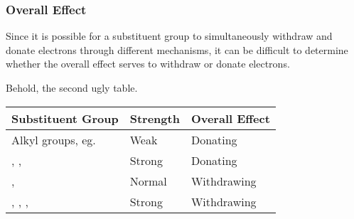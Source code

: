 


	\pagebreak
	\subsubsection{Overall Effect}

		Since it is possible for a substituent group to simultaneously withdraw and donate electrons through different mechanisms,
		it can be difficult to determine whether the overall effect serves to withdraw or donate electrons.

		Behold, the second ugly table.

		\begin{center}\begin{table}[ht]\renewcommand{\arraystretch}{1.4}
		\begin{tabu} to \textwidth {| X[c,m] | X[c,m] | X[c,m] |}

			\hline				Substituent Group				&	Strength	&	Overall Effect	\\

			\hline		Alkyl groups, eg. 				&		Weak	&		Donating	\\
			\hline		{}, , 			&	Strong		&		Donating 	\\
			\hline		\ce{\chlorine}, 					&	Normal		&	Withdrawing		\\
			\hline		{}, , , 	&	Strong		&	Withdrawing		\\
			\hline

		\end{tabu}
		\end{table}\end{center}


















